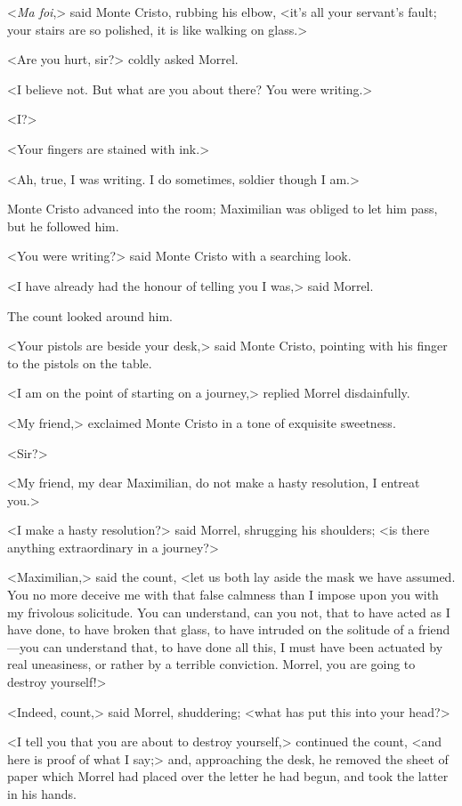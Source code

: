 <\textit{Ma foi},> said Monte Cristo, rubbing his elbow, <it's all your servant's fault; your stairs are so polished, it is like walking on glass.> 

 <Are you hurt, sir?> coldly asked Morrel. 

 <I believe not. But what are you about there? You were writing.> 

 <I?> 

 <Your fingers are stained with ink.> 

 <Ah, true, I was writing. I do sometimes, soldier though I am.> 

 Monte Cristo advanced into the room; Maximilian was obliged to let him pass, but he followed him. 

 <You were writing?> said Monte Cristo with a searching look. 

 <I have already had the honour of telling you I was,> said Morrel. 

 The count looked around him. 

 <Your pistols are beside your desk,> said Monte Cristo, pointing with his finger to the pistols on the table. 

 <I am on the point of starting on a journey,> replied Morrel disdainfully. 

 <My friend,> exclaimed Monte Cristo in a tone of exquisite sweetness. 

 <Sir?> 

 <My friend, my dear Maximilian, do not make a hasty resolution, I entreat you.> 

 <I make a hasty resolution?> said Morrel, shrugging his shoulders; <is there anything extraordinary in a journey?>

<Maximilian,> said the count, <let us both lay aside the mask we have assumed. You no more deceive me with that false calmness than I impose upon you with my frivolous solicitude. You can understand, can you not, that to have acted as I have done, to have broken that glass, to have intruded on the solitude of a friend—you can understand that, to have done all this, I must have been actuated by real uneasiness, or rather by a terrible conviction. Morrel, you are going to destroy yourself!> 

 <Indeed, count,> said Morrel, shuddering; <what has put this into your head?> 

 <I tell you that you are about to destroy yourself,> continued the count, <and here is proof of what I say;> and, approaching the desk, he removed the sheet of paper which Morrel had placed over the letter he had begun, and took the latter in his hands. 


